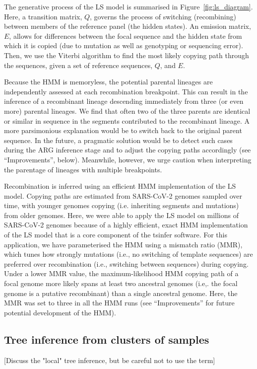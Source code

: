 \documentclass{article}
\begin{document}
The generative process of the LS model is summarised in
Figure~\ref{fig:ls_diagram}. Here, a transition matrix, $Q$, governs the
process of switching (recombining) between members of the reference panel (the
hidden states). An emission matrix, $E$, allows for differences between the
focal sequence and the hidden state from which it is copied (due to mutation as
well as genotyping or sequencing error). Then, we use the Viterbi algorithm
\citep{Viterbi1967-ol} to find the most likely copying path through the
sequences, given a set of reference sequences, $Q$, and $E$.

Because the HMM is memoryless, the potential parental lineages are
independently assessed at each recombination breakpoint. This can result in the
inference of a recombinant lineage descending immediately from three (or even
more) parental lineages. We find that often two of the three parents are
identical or similar in sequence in the segments contributed to the recombinant
lineage. A more parsimonious explanation would be to switch back to the
original parent sequence. In the future, a pragmatic solution would be to
detect such cases during the ARG inference stage and to adjust the copying
paths accordingly (see ``Improvements'', below). Meanwhile, however, we urge
caution when interpreting the parentage of lineages with multiple breakpoints.

Recombination is inferred using an efficient HMM implementation of the
LS model. Copying paths are estimated from SARS-CoV-2 genomes sampled over
time, with younger genomes copying (i.e. inheriting segments and mutations)
from older genomes. Here, we were able to apply the LS model on millions of
SARS-CoV-2 genomes because of a highly efficient, exact HMM implementation of
the LS model that is a core component of the tsinfer software. For this
application, we have parameterised the HMM using a mismatch ratio (MMR), which
tunes how strongly mutations (i.e., no switching of template sequences) are
preferred over recombination (i.e., switching between sequences) during
copying. Under a lower MMR value, the maximum-likelihood HMM copying path of a
focal genome more likely spans at least two ancestral genomes (i.e,. the focal
genome is a putative recombinant) than a single ancestral genome. Here, the MMR
was set to three in all the HMM runs (see ``Improvements'' for future potential
development of the HMM).

\subsection{Tree inference from clusters of samples}
[Discuss the "local" tree inference, but be careful not to use the term]
\end{document}
